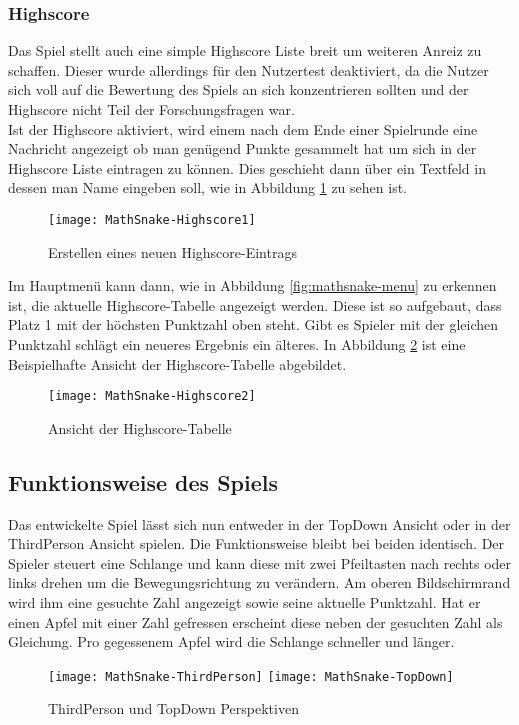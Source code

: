 \subsubsection{Highscore}
Das Spiel stellt auch eine simple Highscore Liste breit um weiteren Anreiz zu schaffen. Dieser wurde allerdings für den Nutzertest deaktiviert, da die Nutzer sich voll auf die Bewertung des Spiels an sich konzentrieren sollten und der Highscore nicht Teil der Forschungsfragen war.\\
Ist der Highscore aktiviert, wird einem nach dem Ende einer Spielrunde eine Nachricht angezeigt ob man genügend Punkte gesammelt hat um sich in der Highscore Liste eintragen zu können. Dies geschieht dann über ein Textfeld in dessen man Name eingeben soll, wie in Abbildung \ref{fig:mathsnake-newHighscore} zu sehen ist.
\begin{figure}[htb]
	\centering
	\texttt{[image: MathSnake-Highscore1]}
	\caption{Erstellen eines neuen Highscore-Eintrags\label{fig:mathsnake-newHighscore}}
\end{figure}
Im Hauptmenü kann dann, wie in Abbildung \ref{fig:mathsnake-menu} zu erkennen ist, die aktuelle Highscore-Tabelle angezeigt werden. Diese ist so aufgebaut, dass Platz 1 mit der höchsten Punktzahl oben steht. Gibt es Spieler mit der gleichen Punktzahl schlägt ein neueres Ergebnis ein älteres. In Abbildung \ref{fig:mathsnake-HighscoreTable} ist eine Beispielhafte Ansicht der Highscore-Tabelle abgebildet.
\begin{figure}[htb]
	\centering
	\texttt{[image: MathSnake-Highscore2]}
	\caption{Ansicht der Highscore-Tabelle\label{fig:mathsnake-HighscoreTable}}
\end{figure}
\subsection{Funktionsweise des Spiels}
Das entwickelte Spiel lässt sich nun entweder in der TopDown Ansicht oder in der ThirdPerson Ansicht spielen. Die Funktionsweise bleibt bei beiden identisch. Der Spieler steuert eine Schlange und kann diese mit zwei Pfeiltasten nach rechts oder links drehen um die Bewegungsrichtung zu verändern. Am oberen Bildschirmrand wird ihm eine gesuchte Zahl angezeigt sowie seine aktuelle Punktzahl. Hat er einen Apfel mit einer Zahl gefressen erscheint diese neben der gesuchten Zahl als Gleichung. Pro gegessenem Apfel wird die Schlange schneller und länger.
\begin{figure}[htb]
	\centering
	\texttt{[image: MathSnake-ThirdPerson]}
	\texttt{[image: MathSnake-TopDown]}
	\caption{ThirdPerson und TopDown Perspektiven\label{fig:mathsnake-perspektives}}
\end{figure}
